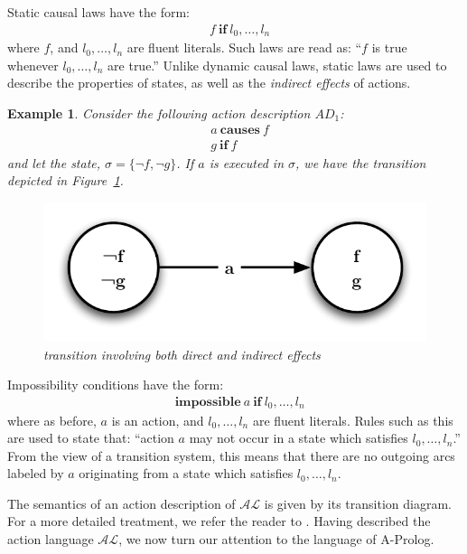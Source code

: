 \documentclass{article}
\newtheorem{example}{Example}
\newcommand{\AL}{\ensuremath{\mathcal{AL}}}
\newcommand{\dynamiclaw}[2]{\ensuremath{#1 \: \mathbf{causes} \: #2}}
\newcommand{\staticlaw}[2]{\ensuremath{#1 \: \mathbf{if} \: #2}}
\newcommand{\impossible}[2]{\ensuremath{\mathbf{impossible} \: #1 \: \mathbf{if} \: #2}}
\begin{document}
Static causal laws have the form:
\begin{align*}
    &\staticlaw{f}{l_{0},\ldots,l_{n}}
\end{align*}
where $f$, and $l_{0},\ldots,l_{n}$ are fluent literals. Such laws are read as: ``$f$ is true whenever $l_{0},\ldots,l_{n}$ are true.'' Unlike dynamic causal laws, static laws are used to describe the properties of states, as well as the \emph{indirect effects} of actions.
\begin{example}
{\rm
Consider the following action description $AD_{1}$:
\begin{align*}
    &\dynamiclaw{a}{f} \\
    &\staticlaw{g}{f}
\end{align*}
and let the state, $\sigma = \{\neg{f}, \neg{g}\}$. If $a$ is executed in $\sigma$, we have the transition depicted in Figure~\ref{fig-scl}.
\begin{figure}[htb]
    \centering
    \includegraphics[scale=0.5]{static-law}
    \caption{transition involving both direct and indirect effects}
    \label{fig-scl}
\end{figure}
}
\end{example}

Impossibility conditions have the form:
\begin{align*}
    &\impossible{a}{l_{0},\ldots,l_{n}}
\end{align*}
where as before, $a$ is an action, and $l_{0},\ldots,l_{n}$ are fluent literals. Rules such as this are used to state that: ``action $a$ may not occur in a state which satisfies $l_{0},\ldots,l_{n}$.'' From the view of a transition system, this means that there are no outgoing arcs labeled by $a$ originating from a state which satisfies $l_{0},\ldots,l_{n}$.

The semantics of an action description of $\AL$ is given by its transition diagram. For a more detailed treatment, we refer the reader to \cite{Bald2005}. Having described the action language $\AL$, we now turn our attention to the language of A-Prolog.
\end{document}
